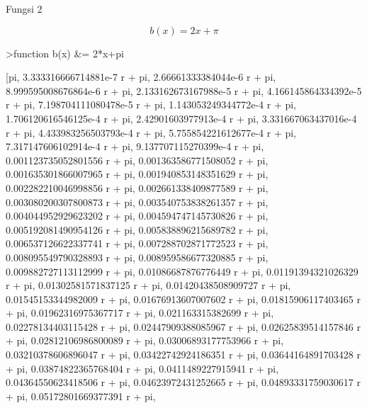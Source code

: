 \documentclass[12pt,arial,letterpaper]{book}
\begin{document}
\begin{eulercomment}
\begin{eulercomment}
\begin{eulercomment}
\begin{eulercomment}
\begin{eulercomment}
\begin{eulercomment}
\begin{eulercomment}
\begin{eulercomment}
\begin{eulercomment}
\begin{eulercomment}
\begin{eulercomment}
\begin{eulercomment}
\begin{eulercomment}
\begin{eulercomment}
\begin{eulercomment}
\begin{eulercomment}
\begin{eulercomment}
\begin{eulercomment}
\begin{eulercomment}
\begin{eulercomment}
\begin{eulercomment}
\begin{eulercomment}
\begin{eulercomment}
Fungsi 2\\
\end{eulercomment}
\begin{eulerformula}
\[
b(x)=2x+\pi
\]
\end{eulerformula}
\begin{eulerprompt}
>function b(x) &= 2*x+pi
\end{eulerprompt}
\begin{euleroutput}
  
          [pi, 3.333316666714881e-7 r + pi, 2.66661333384044e-6 r + pi, 
  8.999595008676864e-6 r + pi, 2.133162673167988e-5 r + pi, 
  4.166145864334392e-5 r + pi, 7.198704111080478e-5 r + pi, 
  1.143053249344772e-4 r + pi, 1.706120616546125e-4 r + pi, 
  2.42901603977913e-4 r + pi, 3.331667063437016e-4 r + pi, 
  4.433983256503793e-4 r + pi, 5.755854221612677e-4 r + pi, 
  7.317147606102914e-4 r + pi, 9.137707115270399e-4 r + pi, 
  0.001123735052801556 r + pi, 0.001363586771508052 r + pi, 
  0.001635301866007965 r + pi, 0.001940853148351629 r + pi, 
  0.002282210046998856 r + pi, 0.002661338409877589 r + pi, 
  0.003080200307800873 r + pi, 0.003540753838261357 r + pi, 
  0.004044952929623202 r + pi, 0.004594747145730826 r + pi, 
  0.005192081490954126 r + pi, 0.005838896215689782 r + pi, 
  0.006537126622337741 r + pi, 0.007288702871772523 r + pi, 
  0.008095549790328893 r + pi, 0.008959586677320885 r + pi, 
  0.009882727113112999 r + pi, 0.01086687876776449 r + pi, 
  0.01191394321026329 r + pi, 0.01302581571837125 r + pi, 
  0.01420438508909727 r + pi, 0.01545153344982009 r + pi, 
  0.01676913607007602 r + pi, 0.01815906117403465 r + pi, 
  0.01962316975367717 r + pi, 0.021163315382699 r + pi, 
  0.02278134403115428 r + pi, 0.02447909388085967 r + pi, 
  0.02625839514157846 r + pi, 0.02812106986800089 r + pi, 
  0.03006893177753966 r + pi, 0.03210378606896047 r + pi, 
  0.03422742924186351 r + pi, 0.03644164891703428 r + pi, 
  0.03874822365768404 r + pi, 0.0411489227915941 r + pi, 
  0.04364550623418506 r + pi, 0.04623972431252665 r + pi, 
  0.04893331759030617 r + pi, 0.05172801669377391 r + pi, 

\end{euleroutput}
\end{eulercomment}
\end{eulercomment}
\end{eulercomment}
\end{eulercomment}
\end{eulercomment}
\end{eulercomment}
\end{eulercomment}
\end{eulercomment}
\end{eulercomment}
\end{eulercomment}
\end{eulercomment}
\end{eulercomment}
\end{eulercomment}
\end{eulercomment}
\end{eulercomment}
\end{eulercomment}
\end{eulercomment}
\end{eulercomment}
\end{eulercomment}
\end{eulercomment}
\end{eulercomment}
\end{eulercomment}
\end{document}

